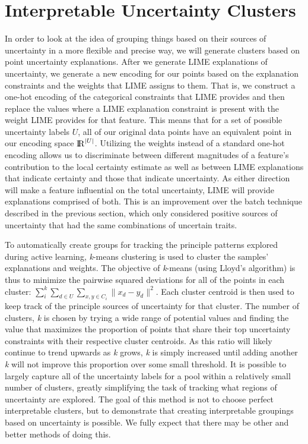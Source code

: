\section{Interpretable Uncertainty Clusters}
\label{sec:auto_class}

In order to look at the idea of grouping things based on their sources of uncertainty in a more flexible and precise way, we will generate clusters based on point uncertainty explanations.  After we generate LIME explanations of uncertainty, we generate a new encoding for our points based on the explanation constraints and the weights that LIME assigns to them. That is, we construct a one-hot encoding of the categorical constraints that LIME provides and then replace the values where a LIME explanation constraint is present with the weight LIME provides for that feature. This means that for a set of possible uncertainty labels $U$, all of our original data points have an equivalent point in our encoding space ${\rm I\!R}^{|U|}$. Utilizing the weights instead of a standard one-hot encoding allows us to discriminate between different magnitudes of a feature's contribution to the local certainty estimate as well as between LIME explanations that indicate certainty and those that indicate uncertainty. As either direction will make a feature influential on the total uncertainty, LIME will provide explanations comprised of both. This is an improvement over the batch technique described in the previous section, which only considered positive sources of uncertainty that had the same combinations of uncertain traits. 

To automatically create groups for tracking the principle patterns explored during active learning, \textit{k}-means clustering is used to cluster the samples' explanations and weights. The objective of \textit{k}-means (using Lloyd's algorithm) is thus to minimize the pairwise squared deviations for all of the points in each cluster: $\sum_{i}^{k} \sum_{d \in {U}} \sum_{x,y \in C_i} \| x_d - y_d \| ^2$.  Each cluster centroid is then used to keep track of the principle sources of uncertainty for that cluster. The number of clusters, \textit{k} is chosen by trying a wide range of potential values and finding the value that maximizes the proportion of points that share their top uncertainty constraints with their respective cluster centroids. As this ratio will likely continue to trend upwards as \textit{k} grows, \textit{k} is simply increased until adding another \textit{k} will not improve this proportion over some small threshold. It is possible to largely capture all of the uncertainty labels for a pool within a relatively small number of clusters, greatly simplifying the task of tracking what regions of uncertainty are explored. The goal of this method is not to choose perfect interpretable clusters, but to demonstrate that creating interpretable groupings based on uncertainty is possible. We fully expect that there may be other and better methods of doing this.

